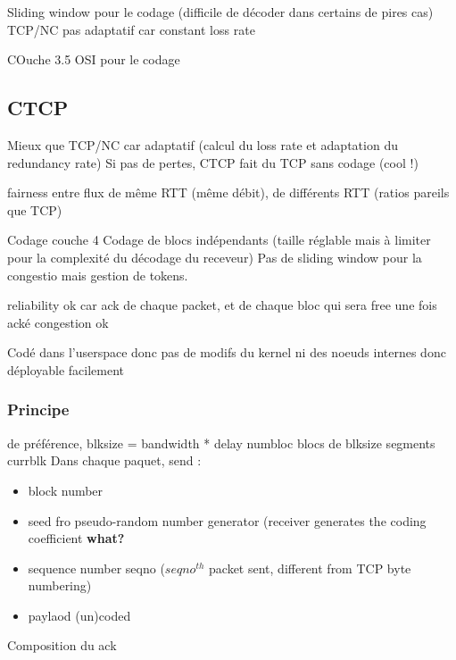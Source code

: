 \documentclass[frenchb]{article}
\begin{document}
Sliding window pour le codage (difficile de décoder dans certains de pires cas)
TCP/NC pas adaptatif car constant loss rate

COuche 3.5 OSI pour le codage

\subsection{CTCP}
Mieux que TCP/NC car adaptatif (calcul du loss rate et adaptation du redundancy rate)
Si pas de pertes, CTCP fait du TCP sans codage (cool !)

fairness entre flux de même RTT (même débit), de différents RTT (ratios pareils que TCP)

Codage couche 4
Codage de blocs indépendants (taille réglable mais à limiter pour la complexité du décodage du receveur)
Pas de sliding window pour la congestio mais gestion de tokens.


reliability ok car ack de chaque packet, et de chaque bloc qui sera free une fois acké
congestion ok

Codé dans l'userspace donc pas de modifs du kernel ni des noeuds internes donc déployable facilement


\subsubsection{Principe}
de préférence, blksize = bandwidth * delay
\textsf{numbloc} blocs de \textsf{blksize} segments
\textsf{currblk}
Dans chaque paquet, send :
\begin{itemize}
\item block number
\item  seed fro pseudo-random number generator (receiver generates the coding coefficient \textbf{what?}
\item sequence number \textsf{seqno} ($seqno^{th}$ packet sent, different from TCP byte numbering)
\item paylaod (un)coded
\end{itemize}

Composition du ack
\end{document}
